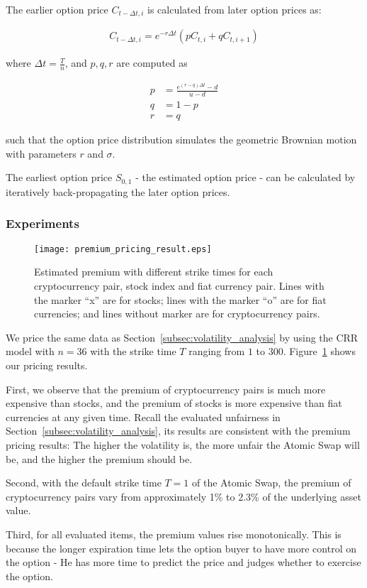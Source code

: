 The earlier option price $C_{t - \Delta t, i}$ is calculated from later option prices as:

\begin{align}
C_{t - \Delta t, i} = e^{-r \Delta t} (p C_{t, i} + q C_{t, i+1})
\end{align}

where $\Delta t = \frac{T}{n}$, and $p, q, r$ are computed as

\begin{align} 
p &= \frac{e^{(r-q)\Delta t} - d}{u - d}\\
q &= 1 - p\\
r &= q
\end{align}

such that the option price distribution simulates the geometric Brownian motion with parameters $r$ and $\sigma$.

The earliest option price $S_{0, 1}$ - the estimated option price - can be calculated by iteratively back-propagating the later option prices. 

\subsubsection{Experiments}


\begin{figure}
    \texttt{[image: premium\_pricing\_result.eps]}
    \caption{Estimated premium with different strike times for each cryptocurrency pair, stock index and fiat currency pair. Lines with the marker ``x'' are for stocks; lines with the marker ``o'' are for fiat currencies; and lines without marker are for cryptocurrency pairs.}
    \label{fig:premium_pricing_result}
\end{figure}

We price the same data as Section~\ref{subsec:volatility_analysis} by using the CRR model with $n = 36$ with the strike time $T$ ranging from $1$ to $300$.
Figure~\ref{fig:premium_pricing_result} shows our pricing results.

First, we observe that the premium of cryptocurrency pairs is much more expensive than stocks, and the premium of stocks is more expensive than fiat currencies at any given time.
Recall the evaluated unfairness in Section~\ref{subsec:volatility_analysis}, its results are consistent with the premium pricing results: The higher the volatility is, the more unfair the Atomic Swap will be, and the higher the premium should be.

Second, with the default strike time $T = 1$ of the Atomic Swap, the premium of cryptocurrency pairs vary from approximately 1\% to 2.3\% of the underlying asset value.

Third, for all evaluated items, the premium values rise monotonically.
This is because the longer expiration time lets the option buyer to have more control on the option - He has more time to predict the price and judges whether to exercise the option.